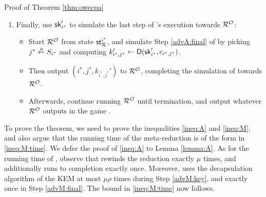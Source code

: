 \begin{namedproof}{Proof of Theorem \ref{thm:owecpa}}
\begin{enumerate}[itemsep=0.1cm]
    \item\label{advM:final} Finally, use \(\mathsf{sk}_{i^{*}}'\) to simulate the
          last step of \advA's execution towards \(\redR^{\oracle}\):
          \begin{itemize}[label={\textbullet},itemsep=0.1cm]
            \item Start \(\redR^{\oracle}\) from state \(\state_{\redR}^{i^{*}}\),
                  and simulate Step \ref{advA:final} of \advA by picking \(j^{*} \sampleR S_{i^{*}}\)
                  and computing \(k_{i^{*},j^{*}}' \leftarrow \mathsf{D}(\mathsf{sk}_{i^{*}}',c_{i^{*},j^{*}})\).
            \item Then output \((i^{*},j^{*}, k_{i^{*},j^{*}}')\) to \(\redR^{\oracle}\),
                  completing the simulation of \advA towards \(\redR^{\oracle}\).
            \item Afterwards, continue running \(\redR^{\oracle}\)
                  until termination, and output whatever \(\redR^{\oracle}\)
                  outputs in the game \SICA.
          \end{itemize}
  \end{enumerate}

  To prove the theorem, we need to prove the inequalities \eqref{ineq:A} and \eqref{ineq:M},
  and also argue that the running time of the meta-reduction \redM is of the form in \eqref{ineq:M:time}.
  We defer the proof of \eqref{ineq:A} to Lemma \ref{lemma:A}.
  As for the running time of \redM,
  observe that \redM rewinds the reduction \redR exactly \(\mu\) times,
  and additionally runs \redR to completion exactly once.
  Moreover, \redM uses the decapsulation algorithm \Decaps of the KEM \KEM
  at most \(\mu \rho\) times during Step \ref{advM:key},
  and exactly once in Step \ref{advM:final}.
  The bound in \eqref{ineq:M:time} now follows.


\end{namedproof}
